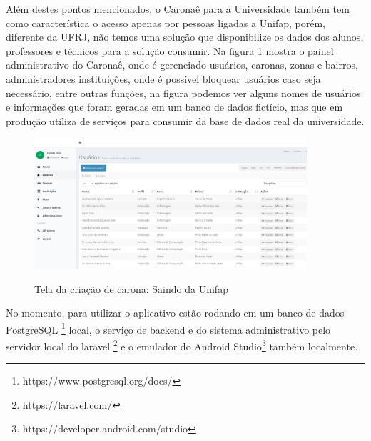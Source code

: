 Além destes pontos mencionados, o Caronaê para a Universidade também tem como característica o acesso apenas por pessoas ligadas a Unifap, porém, diferente da UFRJ, não temos uma solução que disponibilize os dados dos alunos, professores e técnicos para a solução consumir. Na figura \ref{fig:tela_usuarios_painel_administrativo} mostra o painel administrativo do Caronaê, onde é gerenciado usuários, caronas, zonas e bairros, administradores instituições, onde é possível bloquear usuários caso seja necessário, entre outras funções, na figura podemos ver alguns nomes de usuários e informações que foram geradas em um banco de dados fictício, mas que em produção utiliza de serviços para consumir da base de dados real da universidade.

\begin{figure}[!hbtp]
	\centering
	\caption{Tela da criação de carona: Saindo da Unifap}
	\includegraphics[width=0.9\textwidth]{./04-figuras/caronae/tela_usuarios_do_painel_administrativo.png}
	\label{fig:tela_usuarios_painel_administrativo}
\end{figure}

No momento, para utilizar o aplicativo estão rodando em um banco de dados PostgreSQL \footnote{https://www.postgresql.org/docs/} local, o serviço de backend e do sistema administrativo pelo servidor local do laravel \footnote{https://laravel.com/} e o emulador do Android Studio\footnote{https://developer.android.com/studio} também localmente.

